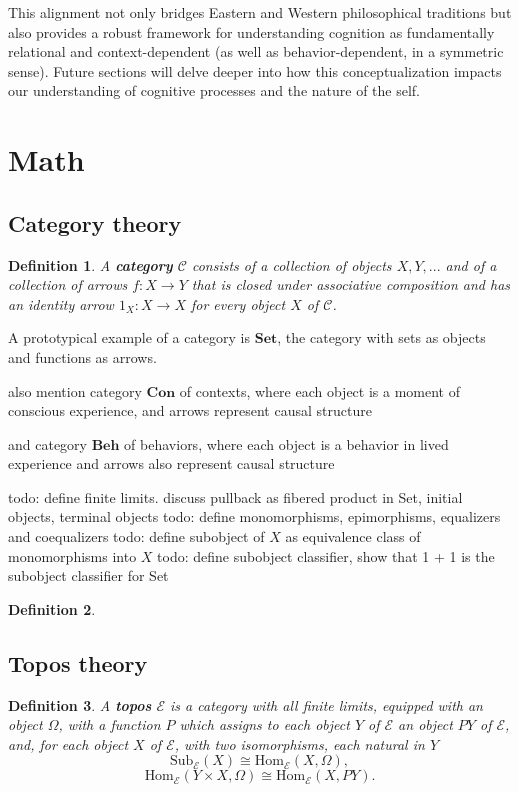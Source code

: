 \documentclass{article}
\newtheorem{definition}{Definition}[section]
\begin{document}
This alignment not only bridges Eastern and Western philosophical traditions but also provides a robust framework for understanding cognition as fundamentally relational and context-dependent (as well as behavior-dependent, in a symmetric sense). Future sections will delve deeper into how this conceptualization impacts our understanding of cognitive processes and the nature of the self.

\section{Math}

\subsection{Category theory}

\begin{definition} A \textbf{category} $\mathcal{C}$ consists of a collection of objects $X, Y, ...$ and of a collection of arrows $f \colon X \to Y$ that is closed under associative composition and has an identity arrow $1_X \colon X \to X$ for every object $X$ of $\mathcal{C}$.
\end{definition}

A prototypical example of a category is $\mathbf{Set}$, the category with sets as objects and functions as arrows.

also mention category $\mathbf{Con}$ of contexts, where each object is a moment of conscious experience, and arrows represent causal structure

and category $\mathbf{Beh}$ of behaviors, where each object is a behavior in lived experience and arrows also represent causal structure

todo: define finite limits. discuss pullback as fibered product in Set, initial objects, terminal objects 
todo: define monomorphisms, epimorphisms, equalizers and coequalizers 
todo: define subobject of $X$ as equivalence class of monomorphisms into $X$ 
todo: define subobject classifier, show that 1 + 1 is the subobject classifier for Set 
\begin{definition}

\end{definition}

\subsection{Topos theory}
\begin{definition}A \textbf{topos} $\mathcal{E}$ is a category with all finite limits, equipped with an object $\Omega$, with a function $P$ which assigns to each object $Y$ of $\mathcal{E}$ an object $PY$ of $\mathcal{E}$, and, for each object $X$ of $\mathcal{E}$, with two isomorphisms, each natural in $Y$
\begin{equation}
\text{Sub}_{\mathcal{E}} (X) \cong \text{Hom}_{\mathcal{E}} (X, \Omega),
\end{equation}
\begin{equation}
\text{Hom}_{\mathcal{E}} (Y \times X, \Omega) \cong \text{Hom}_{\mathcal{E}} (X, PY).
\end{equation}


\end{definition}
\end{document}
